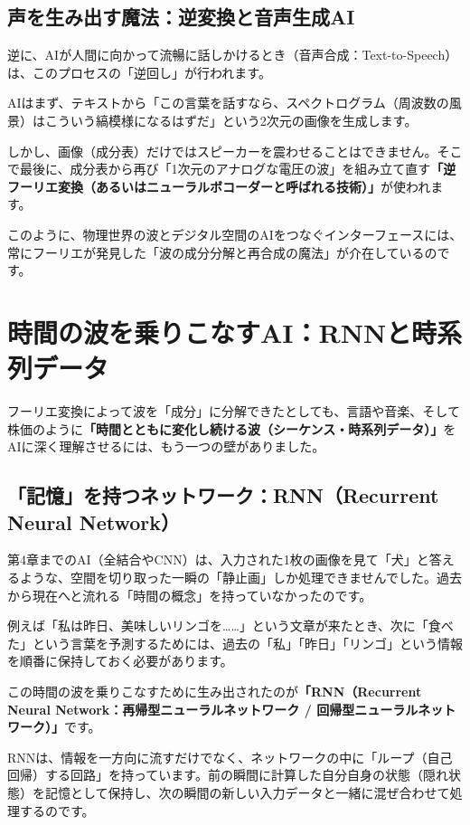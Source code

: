 \subsection{声を生み出す魔法：逆変換と音声生成AI}

逆に、AIが人間に向かって流暢に話しかけるとき（音声合成：Text-to-Speech）は、このプロセスの「逆回し」が行われます。

AIはまず、テキストから「この言葉を話すなら、スペクトログラム（周波数の風景）はこういう縞模様になるはずだ」という2次元の画像を生成します。

しかし、画像（成分表）だけではスピーカーを震わせることはできません。そこで最後に、成分表から再び「1次元のアナログな電圧の波」を組み立て直す\textbf{「逆フーリエ変換（あるいはニューラルボコーダーと呼ばれる技術）」}が使われます。

このように、物理世界の波とデジタル空間のAIをつなぐインターフェースには、常にフーリエが発見した「波の成分分解と再合成の魔法」が介在しているのです。

\section{時間の波を乗りこなすAI：RNNと時系列データ}

フーリエ変換によって波を「成分」に分解できたとしても、言語や音楽、そして株価のように\textbf{「時間とともに変化し続ける波（シーケンス・時系列データ）」}をAIに深く理解させるには、もう一つの壁がありました。

\subsection{「記憶」を持つネットワーク：RNN（Recurrent Neural Network）}

第4章までのAI（全結合やCNN）は、入力された1枚の画像を見て「犬」と答えるような、空間を切り取った一瞬の「静止画」しか処理できませんでした。過去から現在へと流れる「時間の概念」を持っていなかったのです。

例えば「私は昨日、美味しいリンゴを\ldots{}\ldots{}」という文章が来たとき、次に「食べた」という言葉を予測するためには、過去の「私」「昨日」「リンゴ」という情報を順番に保持しておく必要があります。

この時間の波を乗りこなすために生み出されたのが\textbf{「RNN（Recurrent Neural Network：再帰型ニューラルネットワーク / 回帰型ニューラルネットワーク）」}です。

RNNは、情報を一方向に流すだけでなく、ネットワークの中に「ループ（自己回帰）する回路」を持っています。前の瞬間に計算した自分自身の状態（隠れ状態）を記憶として保持し、次の瞬間の新しい入力データと一緒に混ぜ合わせて処理するのです。

